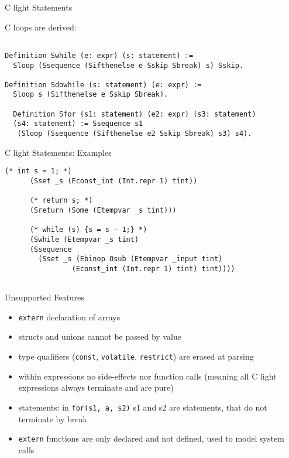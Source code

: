 \documentclass{beamer}
\begin{document}
\begin{frame}[fragile]{C light Statements}

  C loops are derived:

  \begin{lstlisting}[language=Coq]
    
Definition Swhile (e: expr) (s: statement) :=
  Sloop (Ssequence (Sifthenelse e Sskip Sbreak) s) Sskip.

Definition Sdowhile (s: statement) (e: expr) :=
  Sloop s (Sifthenelse e Sskip Sbreak).

  Definition Sfor (s1: statement) (e2: expr) (s3: statement)
  (s4: statement) := Ssequence s1
   (Sloop (Ssequence (Sifthenelse e2 Sskip Sbreak) s3) s4).

  \end{lstlisting}
  


\end{frame}


\begin{frame}[fragile]{C light Statements: Examples}

  \begin{lstlisting}[language=Coq]
     (* int s = 1; *)
      (Sset _s (Econst_int (Int.repr 1) tint))

      (* return s; *)
      (Sreturn (Some (Etempvar _s tint)))

      (* while (s) {s = s - 1;} *)
      (Swhile (Etempvar _s tint) 
      (Ssequence  
        (Sset _s (Ebinop Osub (Etempvar _input tint)
                (Econst_int (Int.repr 1) tint) tint))))


  \end{lstlisting}
  


\end{frame}

\begin{frame}{Unsupported Features}
  \begin{itemize}
  \item \texttt{extern} declaration of arrays
\item structs and unions cannot be passed by value
\item  type qualifiers (\texttt{const}, \texttt{volatile}, \texttt{restrict}) are erased at parsing
\item within expressions no side-effects nor function calls (meaning all C light expressions always terminate and are pure)
\item statements: in \texttt{for(s1, a, s2)} s1 and s2 are statements, that do not terminate by break
\item \texttt{extern} functions are only declared and not defined, used to model system calls
\end{itemize}
  
  \end{frame}
\end{document}
